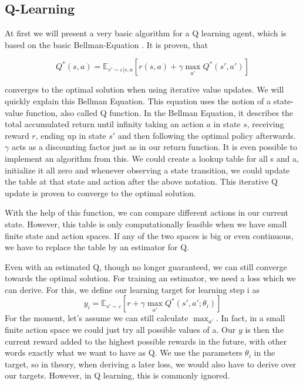 \documentclass[hyperref,final,beleg]{cgvpub}
\begin{document}
\subsection{Q-Learning}

At first we will present a very basic algorithm for a Q learning agent, which is based on the basic Bellman-Equation \cite{bellmanTheoryDynamicProgramming1954}. It is proven, that

\begin{equation}
Q^*(s, a) = \mathbb{E}_{s' \sim \varepsilon | s,a}[r(s,a) + \gamma\max_{a'}Q^*(s', a')]
\end{equation}

converges to the optimal solution when using iterative value updates. We will quickly explain this Bellman Equation. This equation uses the notion of a state-value function, also called Q function. In the Bellman Equation, it describes the total accumulated return until infinity taking an action $a$ in state $s$, receiving reward $r$, ending up in state $s'$ and then following the optimal policy afterwards. $\gamma$ acts as a discounting factor just as in our return function. It is even possible to implement an algorithm from this. We could create a lookup table for all s and a, initialize it all zero and whenever observing a state transition, we could update the table at that state and action after the above notation. This iterative Q update is proven to converge to the optimal solution.

With the help of this function, we can compare different actions in our current state. However, this table is only computationally feasible when we have small finite state and action spaces. If any of the two spaces is big or even continuous, we have to replace the table by an estimator for Q.

Even with an estimated Q, though no longer guaranteed, we can still converge towards the optimal solution. For training an estimator, we need a loss which we can derive. For this, we define our learning target for learning step i as
\begin{equation}
y_i = \mathbb{E}_{s' \sim \varepsilon}[r + \gamma \max_{a'}Q^*(s', a';\theta_{i})]
\end{equation}
For the moment, let's assume we can still calculate $\max_{a'}$. In fact, in a small finite action space we could just try all possible values of a. Our $y$ is then the current reward added to the highest possible rewards in the future, with other words exactly what we want to have as Q. We use the parameters $\theta_{i}$ in the target, so in theory, when deriving a later loss, we would also have to derive over our targets. However, in Q learning, this is commonly ignored.
\end{document}
